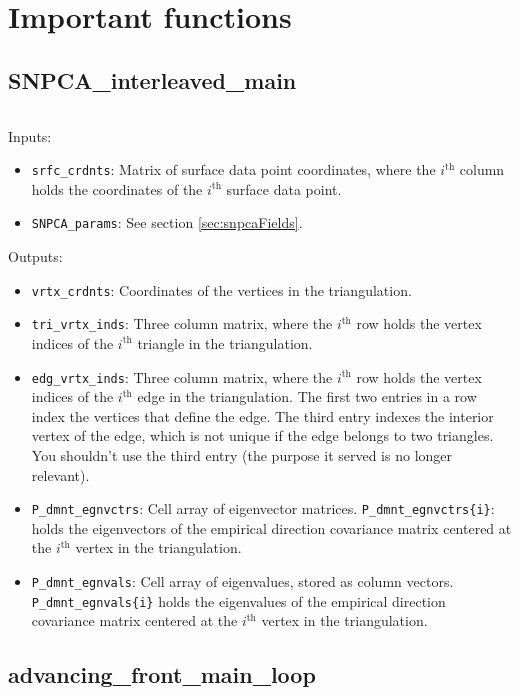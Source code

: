 \documentclass[11pt]{amsart}
\begin{document}
\section{Important functions}
\subsection*{SNPCA\_interleaved\_main}$ $

\noindent
Inputs:
\begin{itemize}
\item \verb+srfc_crdnts+: Matrix of surface data point coordinates, where the $i^{\text{th}}$ column holds the coordinates of the $i^{\text{th}}$ surface data point.
\item \verb+SNPCA_params+: See section \ref{sec:snpcaFields}.
\end{itemize}

\noindent
Outputs:
\begin{itemize}
\item
\verb+vrtx_crdnts+: Coordinates of the vertices in the triangulation.
\item
\verb+tri_vrtx_inds+: Three column matrix, where the $i^{\text{th}}$ row holds the vertex indices of the $i^{\text{th}}$ triangle in the triangulation.
\item
\verb+edg_vrtx_inds+: Three column matrix, where the $i^{\text{th}}$ row holds the vertex indices of the $i^{\text{th}}$ edge in the triangulation.
The first two entries in a row index the vertices that define the edge.
The third entry indexes the interior vertex of the edge, which is not unique if the edge belongs to two triangles. 
You shouldn't use the third entry (the purpose it served is no longer relevant).
\item
\verb+P_dmnt_egnvctrs+: Cell array of eigenvector matrices.
\verb+P_dmnt_egnvctrs{i}+: holds the eigenvectors of the empirical direction covariance matrix centered at the $i^{\text{th}}$ vertex in the triangulation.
\item
\verb+P_dmnt_egnvals+: Cell array of eigenvalues, stored as column vectors. 
\verb+P_dmnt_egnvals{i}+ holds the eigenvalues of the empirical direction covariance matrix centered at the $i^{\text{th}}$ vertex in the triangulation.
\end{itemize}

\subsection*{advancing\_front\_main\_loop}$ $
\end{document}
